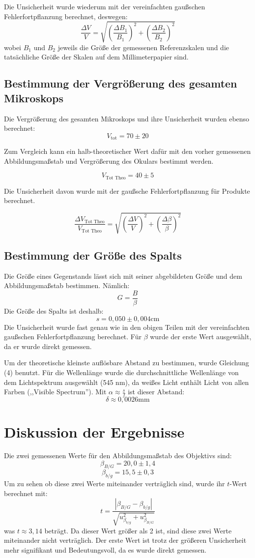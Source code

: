 \documentclass[11pt,a4paper]{article}
\begin{document}
Die Unsicherheit wurde wiederum mit der vereinfachten gaußschen Fehlerfortpflanzung berechnet, deswegen:
$$\frac{\Delta V}{V} = \sqrt{\left(\frac{\Delta B_1}{B_1}\right)^2+\left(\frac{\Delta B_2}{B_2}\right)^2}$$
wobei $B_1$ und $B_2$ jeweils die Größe der gemessenen Referenzskalen und die tatsächliche Größe der Skalen auf dem Millimeterpapier sind. 

\subsection{Bestimmung der Vergrößerung des gesamten Mikroskops}
Die Vergrößerung des gesamten Mikroskops und ihre Unsicherheit wurden ebenso berechnet:
$$V_\textrm{tot} = 70 \pm 20$$

Zum Vergleich kann ein halb-theoretischer Wert dafür mit den vorher gemessenen Abbildungsmaßstab und Vergrößerung des Okulars bestimmt werden. 

$$V_\textrm{Tot Theo} = 40 \pm 5$$

Die Unsicherheit davon wurde mit der gaußsche Fehlerfortpflanzung für Produkte berechnet. 

$$\frac{\Delta V_\textrm{Tot Theo}}{V_\textrm{Tot Theo}} = \sqrt{\left(\frac{\Delta V}{V}\right)^2+\left(\frac{\Delta \beta}{\beta}\right)^2}$$
  
\subsection{Bestimmung der Größe des Spalts}
Die Größe eines Gegenstands lässt sich mit seiner abgebildeten Größe und dem Abbildungsmaßstab bestimmen. Nämlich:
$$ G = \frac{B}{\beta}$$
Die Größe des Spalts ist deshalb:
$$ s = 0,050 \pm 0,004 \textrm{cm}$$
Die Unsicherheit wurde fast genau wie in den obigen Teilen mit der vereinfachten gaußschen Fehlerfortpflanzung berechnet. Für $\beta$ wurde der erste Wert ausgewählt, da er wurde direkt gemessen. 

Um der theoretische kleinste auflösbare Abstand zu bestimmen, wurde Gleichung (4) benutzt. Für die Wellenlänge wurde die durchschnittliche Wellenlänge von dem Lichtspektrum ausgewählt (545 nm), da weißes Licht enthält Licht von allen Farben (,,Visible Spectrum''). Mit $\alpha \approx \frac{s}{f}$ ist dieser Abstand:
$$\delta \approx 0,0026 \textrm{mm}$$


\section{Diskussion der Ergebnisse}
Die zwei gemessenen Werte für den Abbildungsmaßstab des Objektivs sind:
$$ \beta_{B/G} = 20,0 \pm 1,4$$
$$ \beta_{b/g} = 15,5 \pm 0,3$$
Um zu sehen ob diese zwei Werte miteinander verträglich sind, wurde ihr $t$-Wert berechnet mit:
\begin{equation}
t = \frac{|\beta_{B/G}-\beta_{b/g}| }{\sqrt{u_{\beta_{b/g}}^2+u_{\beta_{B/G}}^2}}
\end{equation}
was $t\approx3,14$ beträgt. Da dieser Wert größer als 2 ist, sind diese zwei Werte miteinander nicht verträglich. Der erste Wert ist trotz der größeren Unsicherheit mehr signifikant und Bedeutungsvoll, da es wurde direkt gemessen. 
\end{document}
